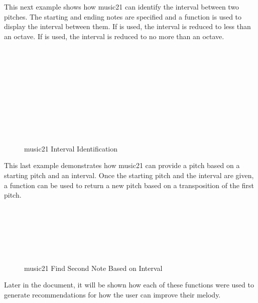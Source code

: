 This next example shows how music21 can identify the interval between two pitches.  The starting and ending notes are specified and a function is used to display the interval between them.  If  is used, the interval is reduced to less than an octave.  If  is used, the interval is reduced to no more than an octave.

\begin{figure}[!htbp]
	\caption{music21 Interval Identification \cite{Cuthbert_2020}}
	 \\
	 \\
	 \\
	 \\
	 \\
	 \\
	 \\
	 \\
	 \\
\end{figure}

This last example demonstrates how music21 can provide a pitch based on a starting pitch and an interval.  Once the starting pitch and the interval are given, a function can be used to return a new pitch based on a transposition of the first pitch.

\begin{figure}[!htbp]
	\caption{music21 Find Second Note Based on Interval \cite{Cuthbert_2020}}
	 \\
	 \\
	 \\
	 \\
	 \\
\end{figure}

Later in the document, it will be shown how each of these functions were used to generate recommendations for how the user can improve their melody.

\pagebreak

